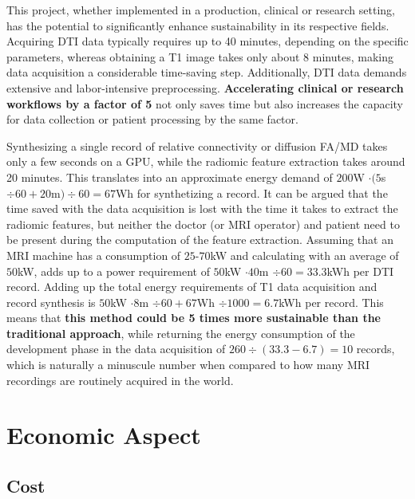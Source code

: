 This project, whether implemented in a production, clinical or research setting, has the potential to significantly enhance sustainability in its respective fields. Acquiring \ac{DTI} data typically requires up to 40 minutes, depending on the specific parameters, whereas obtaining a T1 image takes only about 8 minutes, making data acquisition a considerable time-saving step. Additionally, \ac{DTI} data demands extensive and labor-intensive preprocessing. \textbf{Accelerating clinical or research workflows by a factor of 5} not only saves time but also increases the capacity for data collection or patient processing by the same factor.\par
Synthesizing a single record of relative connectivity or diffusion \ac{FA}/\ac{MD} takes only a few seconds on a GPU, while the radiomic feature extraction takes around 20 minutes. This translates into an approximate energy demand of $200$W $ \cdot (5$s $ \div 60 + 20$m$) \div 60 = 67$Wh for synthetizing a record. It can be argued that the time saved with the data acquisition is lost with the time it takes to extract the radiomic features, but neither the doctor (or MRI operator) and patient need to be present during the computation of the feature extraction. Assuming that an \ac{MRI} machine has a consumption of $25$-$70$kW \cite{kwhmri} and calculating with an average of $50$kW, adds up to a power requirement of $50$kW $ \cdot 40$m $ \div 60 = 33.3$kWh per \ac{DTI} record. Adding up the total energy requirements of T1 data acquisition and record synthesis is $50$kW $ \cdot 8$m $ \div 60 + 67$Wh $ \div 1000 = 6.7$kWh per record. This means that \textbf{this method could be 5 times more sustainable than the traditional approach}, while returning the energy consumption of the development phase in the data acquisition of $260 \div (33.3 - 6.7) = 10$ records, which is naturally a minuscule number when compared to how many \ac{MRI} recordings are routinely acquired in the world.

\section{Economic Aspect}

\subsection{Cost}

